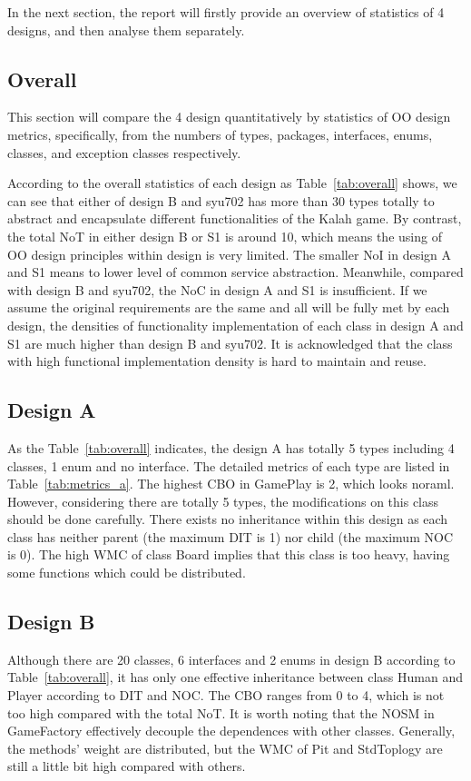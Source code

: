 \documentclass[conference]{IEEEtran}
\begin{document}
	In the next section, the report will firstly provide an overview of statistics of 4 designs, and then analyse them separately.
	
	\subsection{Overall}
	This section will compare the 4 design quantitatively by statistics of \gls{OO} design metrics, specifically, from the numbers of types, packages, interfaces, enums, classes, and exception classes respectively. 
	
	
	According to the overall statistics of each design as Table~\ref{tab:overall} shows, we can see that  either of design B and syu702 has more than 30 types totally to abstract and encapsulate different functionalities of the Kalah game. By contrast, the total \gls{NoT} in either design B or S1 is around 10, which means the using of \gls{OO} design principles within design is very limited. The smaller \gls{NoI} in design A and S1 means to lower level of common service abstraction. Meanwhile, compared with design B and syu702, the \gls{NoC} in design A and S1 is insufficient. If we assume the original requirements are the same and all will be fully met by each design, the densities of functionality implementation of each class in design A and S1 are much higher than design B and syu702. It is acknowledged that the class with high functional implementation density is hard to maintain and reuse. 
	
	\subsection{Design A}		
	
	As the Table~\ref{tab:overall} indicates, the design A has totally 5 types including 4 classes, 1 enum and no interface. The detailed metrics of each type are listed in Table~\ref{tab:metrics_a}. The highest \gls{CBO} in GamePlay is 2, which looks noraml. However, considering there are totally 5 types, the modifications on this class should be done carefully. There exists no inheritance within this design as each class has neither parent (the maximum \gls{DIT} is 1) nor child (the maximum \gls{NOC} is 0). The high \gls{WMC} of class Board implies that this class is too heavy, having some functions which could be distributed.
	
	\subsection{Design B}
	
	Although there are 20 classes, 6 interfaces and 2 enums in design B according to Table~\ref{tab:overall}, it has only one effective inheritance between class Human and Player according to \gls{DIT} and \gls{NOC}. The \gls{CBO} ranges from 0 to 4, which is not too high compared with the total \gls{NoT}. It is worth noting that the \gls{NOSM} in GameFactory effectively decouple the dependences with other classes.  Generally, the methods' weight are distributed, but the \gls{WMC} of Pit and StdToplogy are still a little bit high compared with others. 
	
\end{document}
